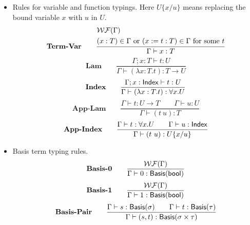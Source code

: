 \begin{itemize}
    \item Rules for variable and function typings. Here $U\{x/u\}$ means replacing the bound variable $x$ with $u$ in $U$.
    \[
        \textbf{Term-Var} \qquad
        \frac{
            \begin{aligned}
                & \mathcal{WF}(\Gamma) \\
                & (x:T) \in \Gamma \text{ or } (x := t : T) \in \Gamma \text{ for some $t$}
            \end{aligned}
        }
        {\Gamma \vdash x : T}
    \]
    \[
        \textbf{Lam} \qquad
        \frac{\Gamma; x : T \vdash t : U}{\Gamma \vdash (\lambda x : T . t) : T \to U}
    \]
    \[
        \textbf{Index} \qquad
        \frac{\Gamma; x : \mathsf{Index} \vdash t : U}{\Gamma \vdash (\lambda x : T.t) : \forall x.U}
    \]
    \[
        \textbf{App-Lam} \qquad
        \frac{\Gamma \vdash t:U \to T \qquad \Gamma \vdash u:U}{\Gamma \vdash (t\ u):T}
    \]
    \[
        \textbf{App-Index} \qquad
        \frac{\Gamma \vdash t:\forall x.U \qquad \Gamma \vdash u : \mathsf{Index}}{\Gamma \vdash (t\ u):U\{x/u\}}
    \]
    
    \item Basis term typing rules. 
    \[  \textbf{Basis-0} \qquad
        \frac{\mathcal{WF}(\Gamma)}{\Gamma \vdash 0 : \mathsf{Basis}(\mathsf{bool})}
    \]
    \[  \textbf{Basis-1} \qquad
        \frac{\mathcal{WF}(\Gamma)}{\Gamma \vdash 1 : \mathsf{Basis}(\mathsf{bool})}
    \]
    \[
        \textbf{Basis-Pair} \qquad
        \frac{\Gamma\vdash s : \mathsf{Basis}(\sigma) \qquad \Gamma\vdash t : \mathsf{Basis}(\tau)} {\Gamma\vdash (s, t) : \mathsf{Basis}(\sigma \times \tau)}
    \]



\end{itemize}
